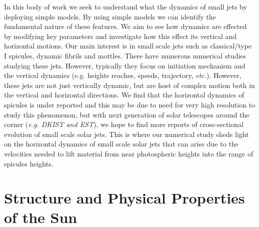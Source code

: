 \documentclass[12pt]{ociamthesis}
\begin{document}
%
In this body of work we seek to understand what the dynamics of small jets by deploying simple models. By using simple models we can identify the fundamental nature of these features. We aim to see how dynamics are effected by modifying key parameters and investigate how this effect its vertical and horizontal motions. Our main interest is in small scale jets such as classical/type I spicules, dynamic fibrils and mottles. There have numerous numerical studies studying these jets. However, typically they focus on initiation mechanism and the vertical dynamics (e.g. heights reaches, speeds, trajectory, \textit{etc.}). However, these jets are not just vertically dynamic, but are host of complex motion both in the vertical and horizontal directions. We find that the horizontal dynamics of spicules is under reported and this may be due to need for very high resolution to study this phenomenon, but with next generation of solar telescopes around the corner (\textit{e.g. DKIST and EST}), we hope to find more reports of cross-sectional evolution of small scale solar jets. This is where our numerical study sheds light on the horizontal dynamics of small scale solar jets that can arise due to the velocities needed to lift material from near photospheric heights into the range of spicules heights.    
\section{Structure and Physical Properties of the Sun}
\label{sec:structure}
\end{document}

